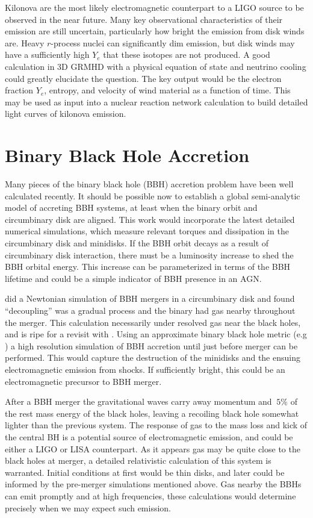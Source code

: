 Kilonova are the most likely electromagnetic counterpart to a LIGO source to be observed in the near future. Many key observational characteristics of their emission are still uncertain, particularly how bright the emission from disk winds are.  Heavy $r$-process nuclei can significantly dim emission, but disk winds may have a sufficiently high $Y_e$ that these isotopes are not produced.  A good calculation in 3D GRMHD with a physical equation of state and neutrino cooling could greatly elucidate the question.  The key output would be the electron fraction $Y_e$, entropy, and velocity of wind material as a function of time. This may be used as input into a nuclear reaction network calculation to build detailed light curves of kilonova emission.

\section*{Binary Black Hole Accretion}

Many pieces of the binary black hole (BBH) accretion problem have been well calculated recently.  It should be possible now to establish a global semi-analytic model of accreting BBH systems, at least when the binary orbit and circumbinary disk are aligned.  This work would incorporate the latest detailed numerical simulations, which measure relevant torques and dissipation in the circumbinary disk and minidisks.  If the BBH orbit decays as a result of circumbinary disk interaction, there must be a luminosity increase to shed the BBH orbital energy.  This increase can be parameterized in terms of the BBH lifetime and could be a simple indicator of BBH presence in an AGN.

\citet{Farris15B} did a Newtonian simulation of BBH mergers in a circumbinary disk and found ``decoupling'' was a gradual process and the binary had gas nearby throughout the merger.  This calculation necessarily under resolved gas near the black holes, and is ripe for a revisit with \grdisco.  Using an approximate binary black hole metric (e.g \citet{Mundim14}) a high resolution simulation of BBH accretion until just before merger can be performed.  This would capture the destruction of the minidisks and the ensuing electromagnetic emission from shocks. If sufficiently bright, this could be an electromagnetic precursor to BBH merger.

After a BBH merger the gravitational waves carry away momentum and  $~5\%$ of the rest mass energy of the black holes, leaving a recoiling black hole somewhat lighter than the previous system.  The response of gas to the mass loss and kick of the central BH is a potential source of electromagnetic emission, and could be either a LIGO or LISA counterpart.  As it appears gas may be quite close to the black holes at merger, a detailed relativistic calculation of this system is warranted.  Initial conditions at first would be thin disks, and later could be informed by the pre-merger simulations mentioned above.  Gas nearby the BBHs can emit promptly and at high frequencies, these calculations would determine precisely when we may expect such emission.

